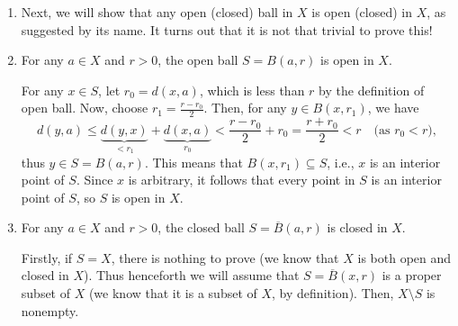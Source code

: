 \begin{enumerate}
\item Next, we will show that any open (closed) ball in \(X\) is open (closed)
in \(X\), as suggested by its name. It turns out that it is not that trivial to
prove this!

\item \label{it:open-ball-open}
For any \(a\in X\) and \(r>0\), the open ball \(S=B(a,r)\) is open in
\(X\).

\begin{pf}
For any \(x\in S\), let \(r_0=d(x,a)\), which is less than \(r\) by the
definition of open ball. Now, choose \(r_1=\frac{r-r_0}{2}\).
Then, for any \(y\in B(x,r_1)\), we have
\[
d(y,a)\le \underbrace{d(y, x)}_{<r_1}+\underbrace{d(x, a)}_{r_0}
<\frac{r-r_0}{2}+r_0
=\frac{r+r_0}{2}<r\quad\text{(as \(r_0<r\))},
\]
thus \(y\in S=B(a,r)\). This means that \(B(x,r_1)\subseteq S\), i.e., \(x\) is
an interior point of \(S\). Since \(x\) is arbitrary, it follows that every
point in \(S\) is an interior point of \(S\), so \(S\) is open in \(X\).
\end{pf}
\begin{center}
\end{center}

\item \label{it:closed-ball-closed}
For any \(a\in X\) and \(r>0\), the closed ball \(S=\overline{B}(a,r)\)
is closed in \(X\).

\begin{pf}
Firstly, if \(S=X\), there is nothing to prove (we know that \(X\) is both open
and closed in \(X\)). Thus henceforth we will assume that
\(S=\overline{B}(x,r)\) is a proper subset of \(X\) (we know that it is a
subset of \(X\), by definition). Then, \(X\setminus S\) is nonempty.


\end{pf}
\end{enumerate}
